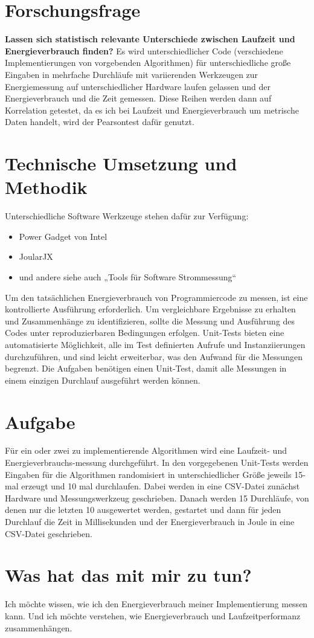 \documentclass[utf8]{article}
\begin{document}
\section{Forschungsfrage}
\textbf{Lassen sich statistisch relevante Unterschiede zwischen Laufzeit und Energieverbrauch finden?}
Es wird  unterschiedlicher Code (verschiedene Implementierungen von vorgebenden Algorithmen)  für unterschiedliche große Eingaben in mehrfache Durchläufe mit variierenden Werkzeugen zur Energiemessung auf unterschiedlicher Hardware  laufen gelassen und der Energieverbrauch und die Zeit gemessen. Diese Reihen werden dann auf Korrelation getestet, da es ich bei Laufzeit und Energieverbrauch um metrische Daten handelt, wird der Pearsontest dafür genutzt. 

\section{Technische Umsetzung und  Methodik}
Unterschiedliche Software Werkzeuge stehen dafür zur Verfügung:
\begin{itemize}
	\item Power Gadget von Intel
  \item JoularJX
  \item und andere siehe auch „Tools für Software Strommessung“
\end{itemize}
Um den tatsächlichen Energieverbrauch von Programmiercode zu messen, ist eine kontrollierte Ausführung erforderlich. Um vergleichbare Ergebnisse zu erhalten und Zusammenhänge zu identifizieren, sollte die Messung und Ausführung des Codes unter reproduzierbaren Bedingungen erfolgen. Unit-Tests bieten eine automatisierte Möglichkeit, alle im Test definierten Aufrufe und Instanziierungen durchzuführen, und sind leicht erweiterbar, was den Aufwand für die Messungen begrenzt. Die Aufgaben benötigen einen Unit-Test, damit  alle Messungen in einem einzigen Durchlauf ausgeführt werden können.


\section{Aufgabe}
Für ein oder zwei zu implementierende Algorithmen  wird eine Laufzeit- und Energieverbrauchs-messung durchgeführt. In den vorgegebenen Unit-Tests werden Eingaben für die Algorithmen randomisiert in unterschiedlicher Größe jeweils 15-mal erzeugt und 10 mal durchlaufen. Dabei werden in eine CSV-Datei zunächst Hardware und  Messungswerkzeug geschrieben. Danach werden 15 Durchläufe, von denen nur die letzten 10 ausgewertet werden, gestartet und dann für jeden Durchlauf die Zeit in Millisekunden und der Energieverbrauch in Joule in eine CSV-Datei geschrieben. 


\section{Was hat das mit mir zu tun?}
Ich möchte wissen,  wie ich den Energieverbrauch meiner Implementierung messen kann. Und ich möchte verstehen, wie Energieverbrauch und Laufzeitperformanz zusammenhängen.




\end{document}
